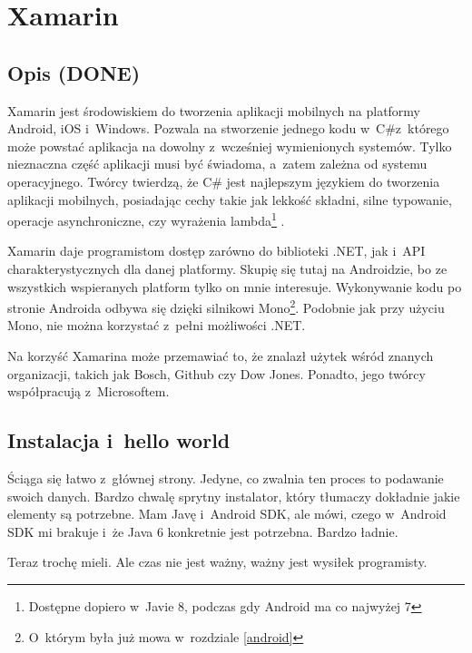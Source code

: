 \section{Xamarin}
\subsection{Opis (DONE)}
Xamarin jest środowiskiem do tworzenia aplikacji mobilnych na platformy Android, iOS i~Windows\cite{xamarin-overview}.
Pozwala na stworzenie jednego kodu w~C\#z~którego może powstać aplikacja na dowolny z~wcześniej wymienionych systemów. Tylko nieznaczna część aplikacji musi być świadoma, a~zatem zależna od systemu operacyjnego.
Twórcy twierdzą, że C\# jest najlepszym językiem do tworzenia aplikacji mobilnych, posiadając cechy takie jak lekkość składni, silne typowanie, operacje asynchroniczne, czy wyrażenia lambda\footnote{Dostępne dopiero w~Javie 8\cite{java-8-features}, podczas gdy Android ma co najwyżej 7\cite{android-java-7}} .

Xamarin daje programistom dostęp zarówno do biblioteki .NET, jak i~API charakterystycznych dla danej platformy. Skupię się tutaj na Androidzie, bo ze wszystkich wspieranych platform tylko on mnie interesuje.
Wykonywanie kodu po stronie Androida odbywa się dzięki silnikowi Mono\footnote{O~którym była już mowa w~rozdziale \ref{android}}\cite{xamarin-android-arch}.
Podobnie jak przy użyciu Mono\cite{mono-compatibility}, nie można korzystać z~pełni możliwości .NET\cite{xamarin-dot-net}.

Na korzyść Xamarina może przemawiać to, że znalazł użytek wśród znanych organizacji, takich jak Bosch, Github czy Dow Jones\cite{xamarin-overview}.
Ponadto, jego twórcy współpracują z~Microsoftem.


\subsection{Instalacja i~hello world}
Ściąga się łatwo z~głównej strony. Jedyne, co zwalnia ten proces to podawanie swoich danych.
Bardzo chwalę sprytny instalator, który tłumaczy dokładnie jakie elementy są potrzebne. Mam Javę i~Android SDK, ale mówi, czego w~Android SDK mi brakuje i~że Java 6 konkretnie jest potrzebna. Bardzo ładnie.

Teraz trochę mieli. Ale czas nie jest ważny, ważny jest wysiłek programisty.


